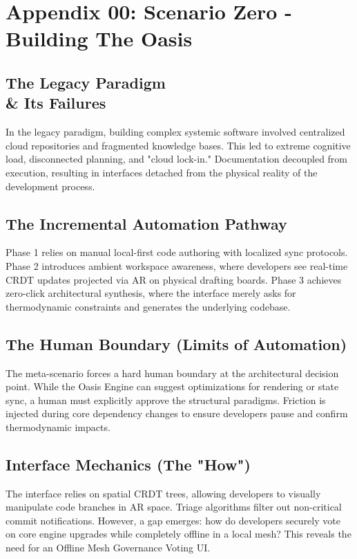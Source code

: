\chapter{Appendix 00: Scenario Zero - Building The Oasis}

\section{The Legacy Paradigm \\\& Its Failures}
In the legacy paradigm, building complex systemic software involved centralized cloud repositories and fragmented knowledge bases. This led to extreme cognitive load, disconnected planning, and "cloud lock-in." Documentation decoupled from execution, resulting in interfaces detached from the physical reality of the development process. 

\section{The Incremental Automation Pathway}
Phase 1 relies on manual local-first code authoring with localized sync protocols. Phase 2 introduces ambient workspace awareness, where developers see real-time CRDT updates projected via AR on physical drafting boards. Phase 3 achieves zero-click architectural synthesis, where the interface merely asks for thermodynamic constraints and generates the underlying codebase.

\section{The Human Boundary (Limits of Automation)}
The meta-scenario forces a hard human boundary at the architectural decision point. While the Oasis Engine can suggest optimizations for rendering or state sync, a human must explicitly approve the structural paradigms. Friction is injected during core dependency changes to ensure developers pause and confirm thermodynamic impacts.

\section{Interface Mechanics (The "How")}
The interface relies on spatial CRDT trees, allowing developers to visually manipulate code branches in AR space. Triage algorithms filter out non-critical commit notifications. However, a gap emerges: how do developers securely vote on core engine upgrades while completely offline in a local mesh? This reveals the need for an Offline Mesh Governance Voting UI.

